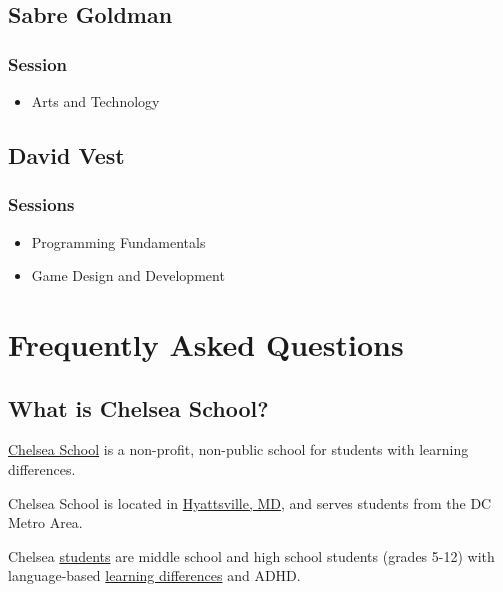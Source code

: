 \documentclass[letterpaper,10pt,english]{sphinxmanual}
\begin{document}
\section{Sabre Goldman}
\label{faculty:sabre-goldman}

\subsection{Session}
\label{faculty:session}\begin{itemize}
\item {} 
Arts and Technology

\end{itemize}


\section{David Vest}
\label{faculty:david-vest}

\subsection{Sessions}
\label{faculty:id1}\begin{itemize}
\item {} 
Programming Fundamentals

\item {} 
Game Design and Development

\end{itemize}


\chapter{Frequently Asked Questions}
\label{faq::doc}\label{faq:index-0}\label{faq:frequently-asked-questions}

\section{What is Chelsea School?}
\label{faq:what-is-chelsea-school}
\href{http://chelseaschool.edu}{Chelsea School} is a non-profit, non-public school for students with learning differences.

Chelsea School is located in \href{http://chelseaschool.edu/about/directions}{Hyattsville, MD}, and serves students from the DC Metro Area.

Chelsea \href{http://chelseaschool.edu/about/bios\#students}{students} are middle school and high school students (grades 5-12) with language-based \href{http://chelseaschool.edu/about/LD}{learning differences} and ADHD.
\end{document}
